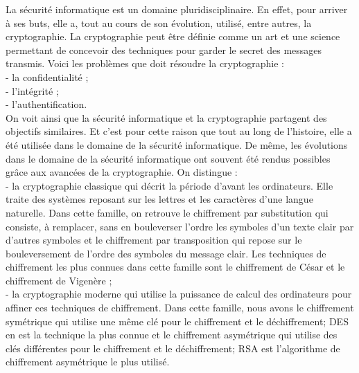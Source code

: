 La sécurité informatique est un domaine pluridisciplinaire. En effet, pour arriver à ses buts, elle a, tout au cours de son évolution, utilisé, entre autres, la cryptographie. La cryptographie peut être définie comme un art et une science permettant de concevoir des techniques pour garder le secret des messages transmis. Voici les problèmes que doit résoudre la cryptographie : \\
-	la confidentialité ; \\
-	l’intégrité ; \\
-	l’authentification. \\
On voit ainsi que la sécurité informatique et la cryptographie partagent des objectifs similaires. Et c’est pour cette raison que tout au long de l’histoire, elle a été utilisée dans le domaine de la sécurité informatique. De même, les évolutions dans le domaine de la sécurité informatique ont souvent été rendus possibles grâce aux avancées de la cryptographie.
On distingue :\\
-	la cryptographie classique qui décrit la période d’avant les ordinateurs. Elle traite des systèmes reposant sur les lettres et les caractères d’une langue naturelle. Dans cette famille, on retrouve le chiffrement par substitution qui consiste, à remplacer, sans en bouleverser l’ordre les symboles d’un texte clair par d’autres symboles et le chiffrement par transposition qui repose sur le bouleversement de l’ordre des symboles du message clair. Les techniques de chiffrement les plus connues dans cette famille sont le chiffrement de César et le chiffrement de Vigenère ; \\
-	 la cryptographie moderne qui utilise la puissance de calcul des ordinateurs pour affiner ces techniques de chiffrement. Dans cette famille, nous avons le chiffrement symétrique qui utilise une même clé pour le chiffrement et le déchiffrement; DES en est la technique la plus connue et le chiffrement asymétrique qui utilise des clés différentes pour le chiffrement et le déchiffrement; RSA est l’algorithme de chiffrement asymétrique le plus utilisé.

